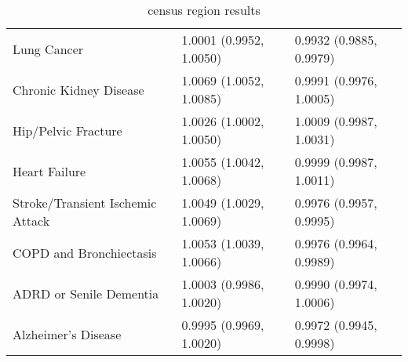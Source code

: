 \begin{table}[ht]
\begin{tabular}{lll}
  Lung Cancer & 1.0001 (0.9952, 1.0050) & 0.9932 (0.9885, 0.9979) \\ 
  Chronic Kidney Disease & 1.0069 (1.0052, 1.0085) & 0.9991 (0.9976, 1.0005) \\ 
  Hip/Pelvic Fracture & 1.0026 (1.0002, 1.0050) & 1.0009 (0.9987, 1.0031) \\ 
  Heart Failure & 1.0055 (1.0042, 1.0068) & 0.9999 (0.9987, 1.0011) \\ 
  Stroke/Transient Ischemic Attack & 1.0049 (1.0029, 1.0069) & 0.9976 (0.9957, 0.9995) \\ 
  COPD and Bronchiectasis & 1.0053 (1.0039, 1.0066) & 0.9976 (0.9964, 0.9989) \\ 
  ADRD or Senile Dementia & 1.0003 (0.9986, 1.0020) & 0.9990 (0.9974, 1.0006) \\ 
  Alzheimer's Disease & 0.9995 (0.9969, 1.0020) & 0.9972 (0.9945, 0.9998) \\ 
   \hline
\end{tabular}
\caption{census region results} 
\label{tab:stratified_OR_S_W}
\end{table}
